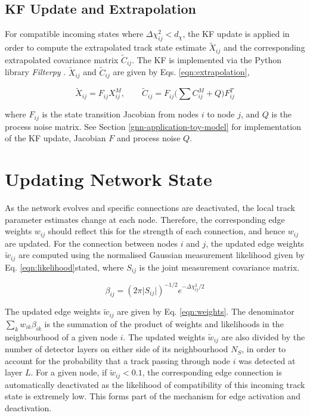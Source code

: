 \subsection{KF Update and Extrapolation}
\label{chapter-5-kf-extrapolation}

For compatible incoming states where $\Delta \chi^{2}_{ij} < d_{\chi}$, the KF update is applied in order to compute the extrapolated track state estimate $\tilde{X}_{ij}$ and the corresponding extrapolated covariance matrix $\widetilde{C}_{ij}$. The KF is implemented via the Python library \textit{Filterpy} \cite{filterpy}. $\tilde{X}_{ij}$ and $\widetilde{C}_{ij}$ are given by Eqs. \eqref{eqn:extrapolation},

\begin{equation}
\tilde{X}_{ij} = F_{ij} X_{ij}^{M}, \qquad \tilde{C}_{ij} = F_{ij} \biggl( \sum C_{ij}^{M} + Q \biggl) F^{T}_{ij}
\label{eqn:extrapolation}
\end{equation}

where $F_{ij}$ is the state transition Jacobian from nodes $i$ to node $j$, and $Q$ is the process noise matrix. See Section \ref{gnn-application-toy-model} for implementation of the KF update, Jacobian $F$ and process noise $Q$. 






\section{Updating Network State}
\label{gnn-updating-network-state}

As the network evolves and specific connections are deactivated, the local track parameter estimates change at each node. Therefore, the corresponding edge weights $w_{ij}$ should reflect this for the strength of each connection, and hence $w_{ij}$ are updated. For the connection between nodes $i$ and $j$, the updated edge weights $\widetilde{w}_{ij}$ are computed using the normalised Gaussian measurement likelihood given by Eq. \eqref{eqn:likelihood}stated, where $S_{ij}$ is the joint measurement covariance matrix.

\begin{equation}
\beta_{ij} = (2 \pi \lvert S_{ij} \rvert )^{-1/2}  e^{-\Delta \chi^{2}_{ij} / 2}
\label{eqn:likelihood}
\end{equation}


The updated edge weights $\widetilde{w}_{ij}$ are given by Eq. \eqref{eqn:weights}. The denominator $\sum_{k}w_{ik}\beta_{ik}$ is the summation of the product of weights and likelihoods in the neighbourhood of a given node $i$. The updated weights $\widetilde{w}_{ij}$ are also divided by the number of detector layers on either side of its neighbourhood $N_S$, in order to account for the probability that a track passing through node $i$ was detected at layer $L$. For a given node, if $\widetilde{w}_{ij} < 0.1$, the corresponding edge connection is automatically deactivated as the likelihood of compatibility of this incoming track state is extremely low. This forms part of the mechanism for edge activation and deactivation.

